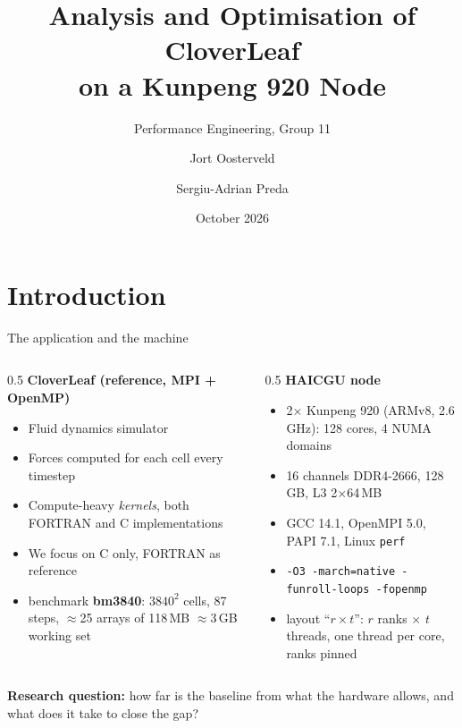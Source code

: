 \documentclass[aspectratio=169,10pt]{beamer}
\title{Analysis and Optimisation of CloverLeaf\\on a Kunpeng 920 Node}
\subtitle{Performance Engineering, Group 11}
\author{Jort Oosterveld \and Sergiu-Adrian Preda}
\institute{Faculty of Science and Engineering, University of Groningen}
\date{October 2026}
\begin{document}
\begin{frame}
  \titlepage
\end{frame}

\section{Introduction}

\begin{frame}{The application and the machine}
  \begin{columns}[T]
    \begin{column}{0.5\textwidth}
      \textbf{CloverLeaf (reference, MPI + OpenMP)}
      \begin{itemize}
        \item Fluid dynamics simulator
        \item Forces computed for each cell every timestep
        \item Compute-heavy \emph{kernels}, both FORTRAN and C implementations
        \item We focus on C only, FORTRAN as reference
        \item benchmark \textbf{bm3840}: $3840^2$ cells, 87 steps, $\approx$25 arrays of 118\,MB $\approx$3\,GB working set
      \end{itemize}
    \end{column}
    \begin{column}{0.5\textwidth}
      \textbf{HAICGU node}
      \begin{itemize}
        \item 2$\times$ Kunpeng 920 (ARMv8, 2.6\,GHz): 128 cores, 4 NUMA domains
        \item 16 channels DDR4-2666, 128\,GB, L3 2$\times$64\,MB
        \item GCC 14.1, OpenMPI 5.0, PAPI 7.1, Linux \texttt{perf}
        \item \texttt{-O3 -march=native -funroll-loops -fopenmp}
        \item layout ``$r\times t$'': $r$ ranks $\times$ $t$ threads, one thread per core, ranks pinned
      \end{itemize}
    \end{column}
  \end{columns}
  \vspace{0.4cm}
  \textbf{Research question:} how far is the baseline from what the hardware allows, and what does it take to close the gap?
\end{frame}
\end{document}
